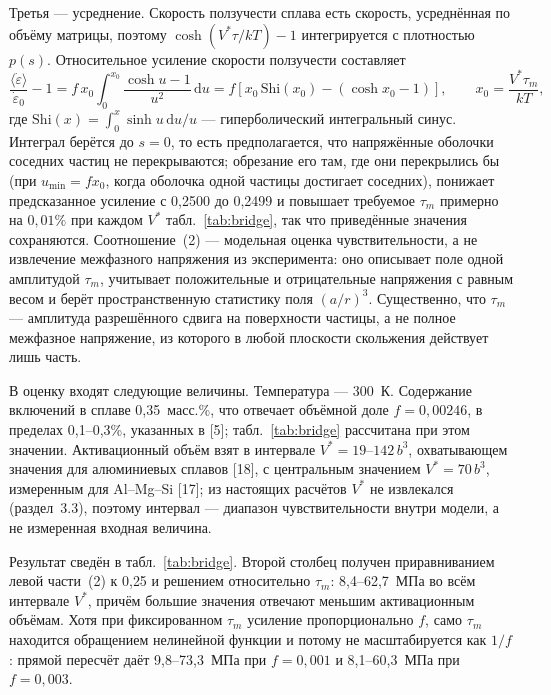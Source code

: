 Третья --- усреднение. Скорость ползучести сплава есть скорость, усреднённая
по объёму матрицы, поэтому $\cosh(V^{*}\tau/kT) - 1$ интегрируется с
плотностью $p(s)$. Относительное усиление скорости ползучести составляет
\begin{equation}
\frac{\langle\dot\varepsilon\rangle}{\dot\varepsilon_0} - 1
 = f\,x_0\!\int_{0}^{x_0}\!\frac{\cosh u - 1}{u^{2}}\,\mathrm{d}u
 = f\left[x_0\,\mathrm{Shi}(x_0) - (\cosh x_0 - 1)\right],
\qquad x_0 = \frac{V^{*}\tau_m}{kT},
\end{equation}
где $\mathrm{Shi}(x) = \int_0^x \sinh u\,\mathrm{d}u/u$ --- гиперболический
интегральный синус. Интеграл берётся до $s = 0$, то есть предполагается, что
напряжённые оболочки соседних частиц не перекрываются; обрезание его там, где
они перекрылись бы (при $u_{\min} = f x_0$, когда оболочка одной частицы
достигает соседних), понижает предсказанное усиление с 0{,}2500 до 0{,}2499 и
повышает требуемое $\tau_m$ примерно на $0{,}01\%$ при каждом $V^{*}$
табл.~\ref{tab:bridge}, так что приведённые значения сохраняются.
Соотношение~(2) --- модельная оценка чувствительности, а не извлечение
межфазного напряжения из эксперимента: оно описывает поле одной амплитудой
$\tau_m$, учитывает положительные и отрицательные напряжения с равным весом и
берёт пространственную статистику поля $(a/r)^{3}$. Существенно, что
$\tau_m$ --- амплитуда разрешённого сдвига на поверхности частицы, а не
полное межфазное напряжение, из которого в любой плоскости скольжения
действует лишь часть.

В оценку входят следующие величины. Температура --- 300~К. Содержание включений в сплаве
0{,}35~масс.\%, что отвечает объёмной доле $f = 0{,}00246$, в пределах
0{,}1--0{,}3\%, указанных в [5]; табл.~\ref{tab:bridge} рассчитана при этом
значении.
Активационный объём взят в интервале $V^{*} = 19$--$142\,b^{3}$,
охватывающем значения для алюминиевых сплавов [18], с центральным значением
$V^{*} = 70\,b^{3}$, измеренным для Al--Mg--Si [17]; из настоящих расчётов
$V^{*}$ не извлекался (раздел~3.3), поэтому интервал --- диапазон
чувствительности внутри модели, а не измеренная входная величина.

Результат сведён в табл.~\ref{tab:bridge}. Второй столбец получен приравниванием
левой части~(2) к 0{,}25 и решением относительно $\tau_m$:
8{,}4--62{,}7~МПа во всём интервале $V^{*}$, причём большие значения отвечают
меньшим активационным объёмам. Хотя при фиксированном $\tau_m$ усиление
пропорционально $f$, само $\tau_m$ находится обращением нелинейной функции и
потому не масштабируется как $1/f$: прямой пересчёт даёт 9{,}8--73{,}3~МПа
при $f = 0{,}001$ и 8{,}1--60{,}3~МПа при $f = 0{,}003$.

